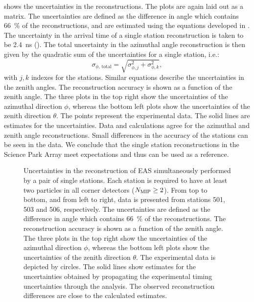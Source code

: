  shows the uncertainties in
the reconstructions. The plots are again laid out as a matrix. The uncertainties
are defined as the difference in angle which contains \SI{66}{\percent} of the
reconstructions, and are estimated using the equations developed in
.  The uncertainty in the arrival time of a
single station reconstruction is taken to be \SI{2.4}{\nano\second}
().  The total uncertainty in the azimuthal
angle reconstruction is then given by the quadratic sum of the uncertainties for
a single station, i.e.:
\begin{equation}
\sigma_{\phi,\,\mathrm{total}} = \sqrt{\sigma_{\phi, j}^2 + \sigma_{\phi, k}^2},
\end{equation}
with $j, k$ indexes for the stations. Similar equations describe the
uncertainties in the zenith angles.
The reconstruction accuracy is shown as a function of the zenith angle.  The
three plots in the top right show the uncertainties of the azimuthal direction $\phi$, whereas the
bottom left plots show the uncertainties of the zenith direction $\theta$.
The points represent the experimental data.  The solid lines are estimates for
the uncertainties. Data and calculations agree for the azimuthal and zenith
angle reconstructions. Small differences in the accuracy of the stations can be seen
in the data. We conclude that the single station reconstructions in the Science
Park Array meet expectations and thus can be used as a reference.
\begin{figure}
\centering
{

}
\caption{Uncertainties in the reconstruction of EAS simultaneously
performed by a pair of single stations.  Each station is required to have
at least two particles in all corner detectors ($N_\mathrm{\mip} \geq 2$).
From top to bottom, and from left to right, data is presented from
stations 501, 503 and 506, respectively. The uncertainties are defined as
the difference in angle which contains \SI{66}{\percent} of the
reconstructions.  The reconstruction accuracy is shown as a function of
the zenith angle.  The three plots in the top right show the uncertainties
of the azimuthal direction $\phi$, whereas the bottom left plots show the
uncertainties of the zenith direction $\theta$. The experimental data is
depicted by circles.  The solid lines show estimates for the uncertainties
obtained by propagating the experimental timing uncertainties through the
analysis.  The observed reconstruction differences are close to the
calculated estimates.}
\label{fig:sciencepark-uncertainty-single-vs-single}
\end{figure}

